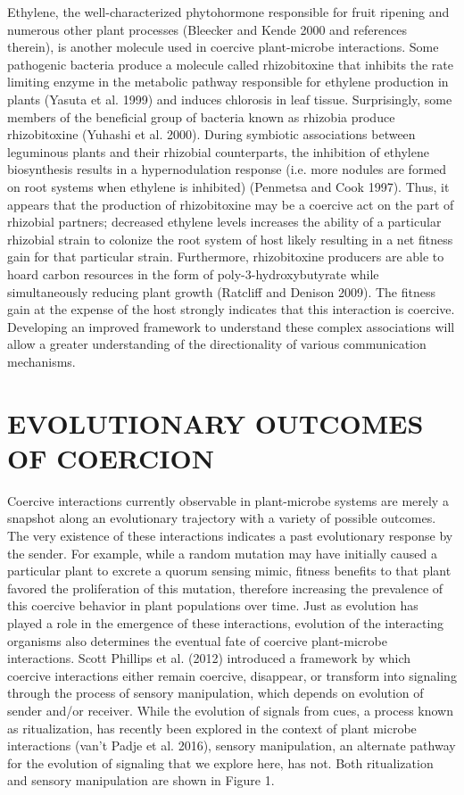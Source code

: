 \documentclass[PhD]{msu-thesis}
\begin{document}
Ethylene, the well-characterized phytohormone responsible for fruit ripening and numerous other plant processes (Bleecker and Kende 2000 and references therein), is another molecule used in coercive plant-microbe interactions. Some pathogenic bacteria produce a molecule called rhizobitoxine that inhibits the rate limiting enzyme in the metabolic pathway responsible for ethylene production in plants (Yasuta et al. 1999) and induces chlorosis in leaf tissue. Surprisingly, some members of the beneficial group of bacteria known as rhizobia produce rhizobitoxine (Yuhashi et al. 2000). During symbiotic associations between leguminous plants and their rhizobial counterparts, the inhibition of ethylene biosynthesis results in a hypernodulation response (i.e. more nodules are formed on root systems when ethylene is inhibited) (Penmetsa and Cook 1997). Thus, it appears that the production of rhizobitoxine may be a coercive act on the part of rhizobial partners; decreased ethylene levels increases the ability of a particular rhizobial strain to colonize the root system of host likely resulting in a net fitness gain for that particular strain. Furthermore, rhizobitoxine producers are able to hoard carbon resources in the form of poly-3-hydroxybutyrate while simultaneously reducing plant growth (Ratcliff and Denison 2009). The fitness gain at the expense of the host strongly indicates that this interaction is coercive. Developing an improved framework to understand these complex associations will allow a greater understanding of the directionality of various communication mechanisms. 

\section{EVOLUTIONARY OUTCOMES OF COERCION}
Coercive interactions currently observable in plant-microbe systems are merely a snapshot along an evolutionary trajectory with a variety of possible outcomes. The very existence of these interactions indicates a past evolutionary response by the sender. For example, while a random mutation may have initially caused a particular plant to excrete a quorum sensing mimic, fitness benefits to that plant favored the proliferation of this mutation, therefore increasing the prevalence of this coercive behavior in plant populations over time. 
Just as evolution has played a role in the emergence of these interactions, evolution of the interacting organisms also determines the eventual fate of coercive plant-microbe interactions. Scott Phillips et al. (2012) introduced a framework by which coercive interactions either remain coercive, disappear, or transform into signaling through the process of sensory manipulation, which depends on evolution of sender and/or receiver. While the evolution of signals from cues, a process known as ritualization, has recently been explored in the context of plant microbe interactions (van’t Padje et al. 2016), sensory manipulation, an alternate pathway for the evolution of signaling that we explore here, has not. Both ritualization and sensory manipulation are shown in Figure 1. 
\end{document}
